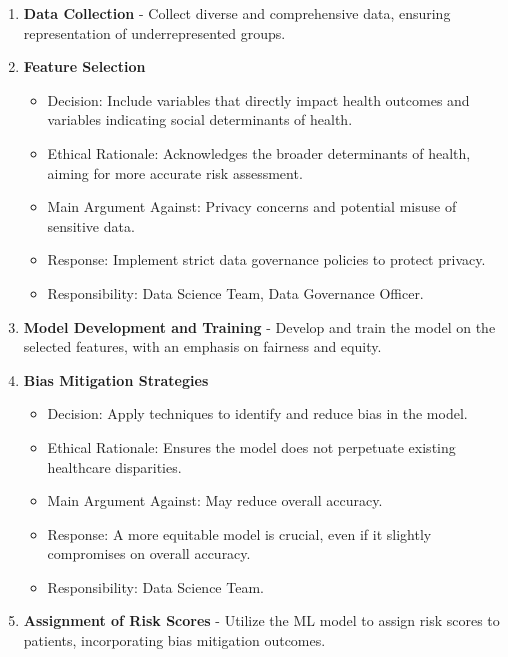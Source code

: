 \documentclass[expanded]{lkx_pset}
\begin{document}
\begin{parts}
\begin{enumerate}
		\item \textbf{Data Collection} - Collect diverse and comprehensive data, ensuring representation of underrepresented groups.

		\item \textbf{Feature Selection}
		      \begin{itemize}
			      \item Decision: Include variables that directly impact health outcomes and variables indicating social determinants of health.
			      \item Ethical Rationale: Acknowledges the broader determinants of health, aiming for more accurate risk assessment.
			      \item Main Argument Against: Privacy concerns and potential misuse of sensitive data.
			      \item Response: Implement strict data governance policies to protect privacy.
			      \item Responsibility: Data Science Team, Data Governance Officer.
		      \end{itemize}

		\item \textbf{Model Development and Training} - Develop and train the model on the selected features, with an emphasis on fairness and equity.

		\item \textbf{Bias Mitigation Strategies}
		      \begin{itemize}
			      \item Decision: Apply techniques to identify and reduce bias in the model.
			      \item Ethical Rationale: Ensures the model does not perpetuate existing healthcare disparities.
			      \item Main Argument Against: May reduce overall accuracy.
			      \item Response: A more equitable model is crucial, even if it slightly compromises on overall accuracy.
			      \item Responsibility: Data Science Team.
		      \end{itemize}

		\item \textbf{Assignment of Risk Scores} - Utilize the ML model to assign risk scores to patients, incorporating bias mitigation outcomes.


\end{enumerate}
\end{parts}
\end{document}
